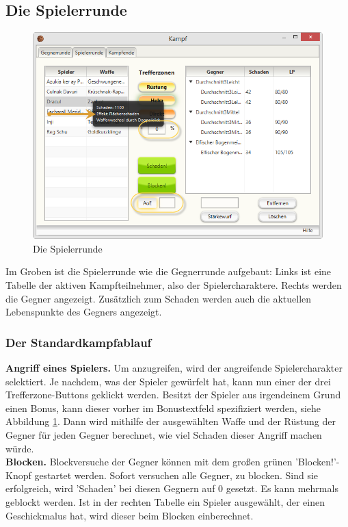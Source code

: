 \documentclass[11pt, a4paper, german]{article}
\begin{document}
\subsection{Die Spielerrunde}\label{Abschnitt:Spielerrunde}
\begin{figure}
\centering
\includegraphics[width=\linewidth]{Bilder/Spielerrunde.png}
\caption{Die Spielerrunde}
\label{Bild:Spielerrunde}
\end{figure}
Im Groben ist die Spielerrunde wie die Gegnerrunde aufgebaut: Links ist eine Tabelle der aktiven Kampfteilnehmer, also der Spielercharaktere. Rechts werden die Gegner angezeigt. Zusätzlich zum Schaden werden auch die aktuellen Lebenspunkte des Gegners angezeigt.\\

\subsubsection{Der Standardkampfablauf}\label{Abschnitt:standardkampf}
\textbf{Angriff eines Spielers.} Um anzugreifen, wird der angreifende Spielercharakter selektiert. Je nachdem, was der Spieler gewürfelt hat, kann nun einer der drei Trefferzone-Buttons geklickt werden. Besitzt der Spieler aus irgendeinem Grund einen Bonus, kann dieser vorher im Bonustextfeld spezifiziert werden, siehe Abbildung \ref{Bild:Spielerrunde}. Dann wird mithilfe der ausgewählten Waffe und der Rüstung der Gegner für jeden Gegner berechnet, wie viel Schaden dieser Angriff machen würde.\\

\textbf{Blocken.} Blockversuche der Gegner können mit dem großen grünen 'Blocken!'-Knopf gestartet werden. Sofort versuchen alle Gegner, zu blocken. Sind sie erfolgreich, wird 'Schaden' bei diesen Gegnern auf 0 gesetzt. Es kann mehrmals geblockt werden. Ist in der rechten Tabelle ein Spieler ausgewählt, der einen Geschickmalus hat, wird dieser beim Blocken einberechnet.\\
\end{document}
